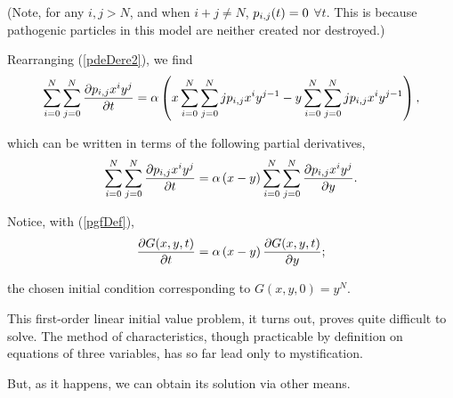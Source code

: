 \noindent
(Note, for any $i, j > N$, and when $i+j \neq N$, $p_{i,j}(t) = 0$ $\forall t$. This is because pathogenic particles in this model are neither created nor destroyed.)

Rearranging (\ref{pdeDere2}), we find 
\begin{equation*}
\label{pdeDerev2}
\sum_{i = 0}^N\sum_{j=0}^N\displaystyle\frac{\partial p_{i,j} x^iy^j}{\partial t} = \alpha\left(x\sum_{i = 0}^N\sum_{j=0}^N j p_{i,j}x^{i}y^{j-1} -  y\sum_{i = 0}^N\sum_{j=0}^Nj p_{i,j} x^iy^{j-1} \right),
\end{equation*}

\noindent
which can be written in terms of the following partial derivatives,
\begin{equation*}
\label{pdeDerev2}
\sum_{i = 0}^N\sum_{j=0}^N\displaystyle\frac{\partial p_{i,j} x^iy^j}{\partial t} = \alpha\left(x - y\right)\sum_{i = 0}^N\sum_{j=0}^N \displaystyle\frac{\partial p_{i,j} x^iy^j}{\partial y}.
\end{equation*}

\noindent
Notice, with (\ref{pgfDef}), 
\begin{equation}
\label{PDE1}
\displaystyle\frac{\partial G(x,y,t)}{\partial t} = \alpha\left(x - y\right) \displaystyle\frac{\partial G(x,y,t)}{\partial y};
\end{equation}

\noindent
the chosen initial condition corresponding to $G(x,y,0) = y^N$.
 
This first-order linear initial value problem, it turns out, proves quite difficult to solve. The method of characteristics, though practicable by definition on equations of three variables, has so far lead only to mystification.

But, as it happens, we can obtain its solution via other means. 

